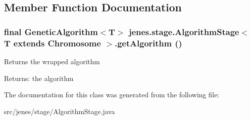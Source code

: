 \subsection{Member Function Documentation}
\hypertarget{classjenes_1_1stage_1_1_algorithm_stage_3_01_t_01extends_01_chromosome_01_4_7c1be30eb9852c0f16031f3802d770aa}{
\subsubsection[getAlgorithm]{\setlength{\rightskip}{0pt plus 5cm}final GeneticAlgorithm$<$T$>$ jenes.stage.AlgorithmStage$<$ T extends Chromosome $>$.getAlgorithm ()}}
\label{classjenes_1_1stage_1_1_algorithm_stage_3_01_t_01extends_01_chromosome_01_4_7c1be30eb9852c0f16031f3802d770aa}


Returns the wrapped algorithm

\begin{Desc}
\item[Returns:]the algorithm \end{Desc}


The documentation for this class was generated from the following file:\begin{CompactItemize}
\item 
src/jenes/stage/AlgorithmStage.java\end{CompactItemize}
